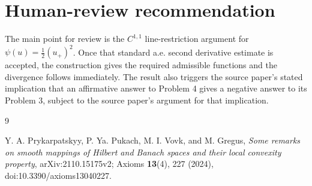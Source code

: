 \documentclass[11pt]{article}
\begin{document}
\section{Human-review recommendation}

The main point for review is the $C^{1,1}$ line-restriction argument for
$\psi(u)=\frac12(u_+)^2$.  Once that standard a.e. second derivative estimate
is accepted, the construction gives the required admissible functions and the
divergence follows immediately.  The result also triggers the source paper's
stated implication that an affirmative answer to Problem 4 gives a negative
answer to its Problem 3, subject to the source paper's argument for that
implication.

\begin{thebibliography}{9}

Y. A. Prykarpatskyy, P. Ya. Pukach, M. I. Vovk, and M. Gregus,
\emph{Some remarks on smooth mappings of Hilbert and Banach spaces and their
local convexity property}, arXiv:2110.15175v2; Axioms \textbf{13}(4), 227
(2024), doi:10.3390/axioms13040227.

\end{thebibliography}
\end{document}
